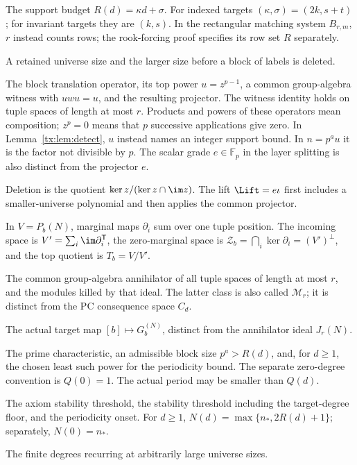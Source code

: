 \documentclass[11pt,a4paper,oneside,openany]{book}
\theoremstyle{definition}\newtheorem{definition}[theorem]{Definition}
\theoremstyle{remark}\newtheorem{remark}[theorem]{Remark}
\numberwithin{equation}{chapter}
\begin{document}
\begin{description}[style=nextline,leftmargin=1em,labelindent=0pt,labelwidth=0pt]
\item[$r=R(d),\kappa,\sigma$] The support budget $R(d)=\kappa d+\sigma$.
For indexed targets $(\kappa,\sigma)=(2k,s+t)$; for invariant targets
they are $(k,s)$.
In the rectangular matching system $B_{r,m}$, $r$ instead counts
rows; the rook-forcing proof specifies its row set $R$ separately.
\item[$n,N=n+q$] A retained universe size and the larger size before
a block of labels is deleted.
\item[$z,u,w,e$] The block translation operator, its top power
$u=z^{p-1}$, a common group-algebra witness with $uwu=u$, and the
resulting projector. The witness identity holds on tuple spaces of
length at most $r$. Products and powers of these operators mean
composition; $z^p=0$ means that $p$ successive applications give zero.
In Lemma~\ref{tx:lem:detect}, $u$ instead names an integer support
bound. In $n=p^au$ it is the factor not divisible by $p$.
The scalar grade $e\in\mathbb F_p$ in the layer splitting is also
distinct from the projector $e$.
\item[$\Del,\Lift$] Deletion is the quotient
$\ker z/(\ker z\cap\im z)$. The lift $\Lift=e\iota$ first includes
a smaller-universe polynomial and then applies the common projector.
\item[$V',\mathcal Z_b,T_b$] In $V=P_b(N)$, marginal maps $\partial_i$
sum over one tuple position. The incoming space is
$V'=\sum_i\im\partial_i^{\mathsf T}$, the zero-marginal space is
$\mathcal Z_b=\bigcap_i\ker\partial_i=(V')^\perp$, and the top quotient
is $T_b=V/V'$.
\item[$J_r(N),\mathcal C_r(N)$] The common group-algebra annihilator of
all tuple spaces of length at most $r$, and the modules killed by that
ideal. The latter class is also called $\mathcal M_r$; it is distinct
from the PC consequence space $C_d$.
\item[$J_N$] The actual target map $[b]\mapsto G_b^{(N)}$, distinct from
the annihilator ideal $J_r(N)$.
\item[$p,q,Q(d)$] The prime characteristic, an admissible block size
$p^a>R(d)$, and, for $d\ge1$, the chosen least such power for the
periodicity bound. The separate zero-degree convention is $Q(0)=1$.
The actual period may be smaller than $Q(d)$.
\item[$n_0,n_*,N(d)$] The axiom stability threshold, the stability threshold
including the target-degree floor, and the periodicity onset.
For $d\ge1$, $N(d)=\max\{n_*,2R(d)+1\}$; separately, $N(0)=n_*$.
\item[$E(h)$] The finite degrees recurring at arbitrarily large universe sizes.

\end{description}
\end{document}
